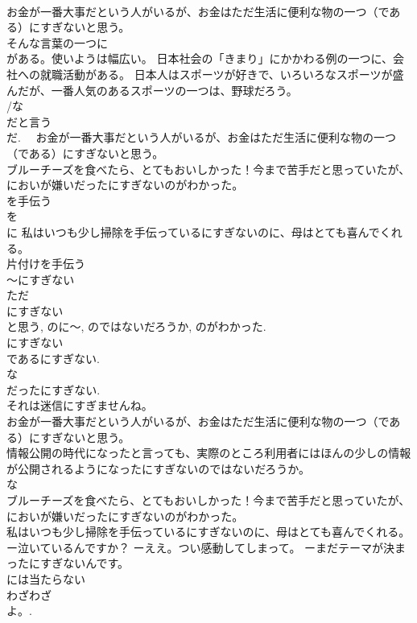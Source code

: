 \documentclass[8pt]{extreport}
\begin{document}
\begin{CJK}{UTF8}{min}
\\	お金が一番大事だという人がいるが、お金はただ生活に便利な物の一つ（である）にすぎないと思う。 
\\	そんな言葉の一つに
\\	がある。使いようは幅広い。 日本社会の「きまり」にかかわる例の一つに、会社への就職活動がある。 日本人はスポーツが好きで、いろいろなスポーツが盛んだが、一番人気のあるスポーツの一つは、野球だろう。
\\	/な
\\	だと言う	
\\	だ.　 お金が一番大事だという人がいるが、お金はただ生活に便利な物の一つ（である）にすぎないと思う。 
\\	ブルーチーズを食べたら、とてもおいしかった！今まで苦手だと思っていたが、においが嫌いだったにすぎないのがわかった。 
\\	を手伝う	
\\	を 
\\	に 私はいつも少し掃除を手伝っているにすぎないのに、母はとても喜んでくれる。 
\\	片付けを手伝う 
\\	～にすぎない	
\\	ただ 
\\	にすぎない 
\\	と思う, のに～, のではないだろうか, のがわかった. 
\\	にすぎない 
\\	であるにすぎない. 
\\	な
\\	だったにすぎない. 
\\	それは迷信にすぎませんね。 
\\	お金が一番大事だという人がいるが、お金はただ生活に便利な物の一つ（である）にすぎないと思う。 
\\	情報公開の時代になったと言っても、実際のところ利用者にはほんの少しの情報が公開されるようになったにすぎないのではないだろうか。 
\\	な
\\	ブルーチーズを食べたら、とてもおいしかった！今まで苦手だと思っていたが、においが嫌いだったにすぎないのがわかった。 
\\	私はいつも少し掃除を手伝っているにすぎないのに、母はとても喜んでくれる。 
\\	ー泣いているんですか？ ーええ。つい感動してしまって。 ーまだテーマが決まったにすぎないんです。 
\\	には当たらない	
\\	わざわざ 
\\	よ。. 

\end{CJK}
\end{document}
